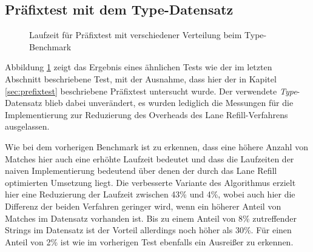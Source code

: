 \subsection{Präfixtest mit dem Type-Datensatz}

\begin{figure}[ht]
	\centering
	\caption{Laufzeit für Präfixtest mit verschiedener Verteilung beim Type-Benchmark}
\label{fig:type_prefix}
\end{figure}

Abbildung \ref{fig:type_prefix} zeigt das Ergebnis eines ähnlichen Tests wie der im letzten Abschnitt beschriebene Test, mit der Ausnahme, dass hier der in Kapitel \ref{sec:prefixtest} beschriebene Präfixtest untersucht wurde.
Der verwendete \emph{Type}-Datensatz blieb dabei unverändert, es wurden lediglich die Messungen für die Implementierung zur Reduzierung des Overheads des Lane Refill-Verfahrens ausgelassen.

Wie bei dem vorherigen Benchmark ist zu erkennen, dass eine höhere Anzahl von Matches hier auch eine erhöhte Laufzeit bedeutet und dass die Laufzeiten der naiven Implementierung bedeutend über denen der durch das Lane Refill optimierten Umsetzung liegt.
Die verbesserte Variante des Algorithmus erzielt hier eine Reduzierung der Laufzeit zwischen 43\% und 4\%, wobei auch hier die Differenz der beiden Verfahren geringer wird, wenn ein höherer Anteil von Matches im Datensatz vorhanden ist.
Bis zu einem Anteil von 8\% zutreffender Strings im Datensatz ist der Vorteil allerdings noch höher als 30\%.
Für einen Anteil von 2\% ist wie im vorherigen Test ebenfalls ein Ausreißer zu erkennen.

